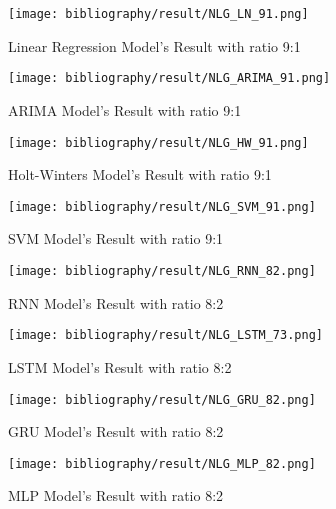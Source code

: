 \documentclass{ieeeojies}
\begin{document}
	\begin{figure}[H]
		\centering
		\begin{minipage}{0.9\linewidth}
			\centering
			\texttt{[image: bibliography/result/NLG\_LN\_91.png]}
			\caption{Linear Regression Model's Result with ratio 9:1}
			\label{fig3.1}
		\end{minipage}
	\end{figure}
	\begin{figure}[H]
		\centering
		\begin{minipage}{0.9\linewidth}
			\centering
			\texttt{[image: bibliography/result/NLG\_ARIMA\_91.png]}
			\caption{ARIMA Model's Result with ratio 9:1}
			\label{fig3.2}
		\end{minipage}
	\end{figure}
	\begin{figure}[H]
		\centering
		\begin{minipage}{0.9\linewidth}
			\centering
			\texttt{[image: bibliography/result/NLG\_HW\_91.png]}
			\caption{Holt-Winters Model's Result with ratio 9:1}
			\label{fig3.3}
		\end{minipage}
	\end{figure}
	\begin{figure}[H]
		\centering
		\begin{minipage}{0.9\linewidth}
			\centering
			\texttt{[image: bibliography/result/NLG\_SVM\_91.png]}
			\caption{SVM Model's Result with ratio 9:1}
			\label{fig3.4}
		\end{minipage}
	\end{figure}
	\begin{figure}[H]
		\centering
		\begin{minipage}{0.9\linewidth}
			\centering
			\texttt{[image: bibliography/result/NLG\_RNN\_82.png]}
			\caption{RNN Model's Result with ratio 8:2}
			\label{fig3.5}
		\end{minipage}
	\end{figure}
	\begin{figure}[H]
		\centering
		\begin{minipage}{0.9\linewidth}
			\centering
			\texttt{[image: bibliography/result/NLG\_LSTM\_73.png]}
			\caption{LSTM Model's Result with ratio 8:2}
			\label{fig3.6}
		\end{minipage}
	\end{figure}
	\begin{figure}[H]
		\centering
		\begin{minipage}{0.9\linewidth}
			\centering
			\texttt{[image: bibliography/result/NLG\_GRU\_82.png]}
			\caption{GRU Model's Result with ratio 8:2}
			\label{fig3.7}
		\end{minipage}
	\end{figure}
	\begin{figure}[H]
		\centering
		\begin{minipage}{0.9\linewidth}
			\centering
			\texttt{[image: bibliography/result/NLG\_MLP\_82.png]}
			\caption{MLP Model's Result with ratio 8:2}
			\label{fig3.8}
		\end{minipage}
	\end{figure}
	\vspace{\baselineskip}
\end{document}
